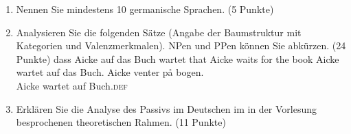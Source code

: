\documentclass[fleqn,10pt,a4paper]{article}
\begin{document}






\bigskip

\begin{enumerate}
\item Nennen Sie mindestens 10 germanische Sprachen. (5 Punkte)
\item Analysieren Sie die folgenden Sätze (Angabe der Baumstruktur mit Kategorien und
  Valenzmerkmalen). NPen und PPen können Sie abkürzen. (24 Punkte)
\eal
\ex dass Aicke auf das Buch wartet
\ex that Aicke waits for the book
\ex Aicke wartet auf das Buch.
\ex 
\gll Aicke venter på bogen.\\
     Aicke wartet auf Buch.\textsc{def}\\
\zl
\item Erklären Sie die Analyse des Passivs im Deutschen im in der Vorlesung besprochenen
  theoretischen Rahmen. (11 Punkte)
\end{enumerate}





\end{document}

